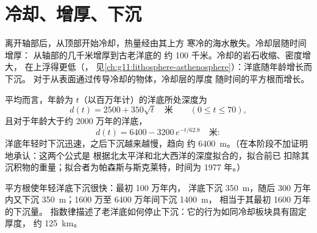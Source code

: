 \section{冷却、增厚、下沉}

离开轴部后，从顶部开始冷却，热量经由其上方
寒冷的海水散失。冷却层随时间增厚：
从轴部的几千米增厚到古老洋底的
约 100 千米。冷却的岩石收缩、密度增大，
在上浮得更低（，
见\cref{ch:g11:lithosphere-asthenosphere}）：洋底随年龄增长而下沉。
对于从表面通过传导冷却的物体，冷却层的厚度
随时间的平方根而增长。

\begin{proposition}[洋底深度随年龄的变化]\label{prop:g11:ocean-ridges:depth-age}
平均而言，年龄为 $t$（以百万年计）的洋底所处深度为
\[
  d(t) = 2500 + 350\sqrt{t} \quad \text{米} \qquad (0 \le t \le 70),
\]
且对于年龄大于约 2000 万年的洋底，
\[
  d(t) = 6400 - 3200\,e^{-t/62.8} \quad \text{米}:
\]
洋底年轻时下沉迅速，之后下沉越来越慢，趋向
约 \qty{6400}{m}。（在本阶段不加证明地承认：这两个公式是
根据北太平洋和北大西洋的深度拟合的，拟合前已
扣除其沉积物的重量；拟合者为帕森斯与斯克莱特，时间为 1977 年。）
\end{proposition}

平方根使年轻洋底下沉很快：最初 100 万年内，
洋底下沉 \qty{350}{m}，随后 300 万年内又下沉
\qty{350}{m}；1600 万至 6400 万年间下沉 \qty{1400}{m}，
相当于其最初 1600 万年的下沉量。
指数律描述了老洋底如何停止下沉：它的行为如同冷却板块具有固定厚度，
约 \qty{125}{km}。

